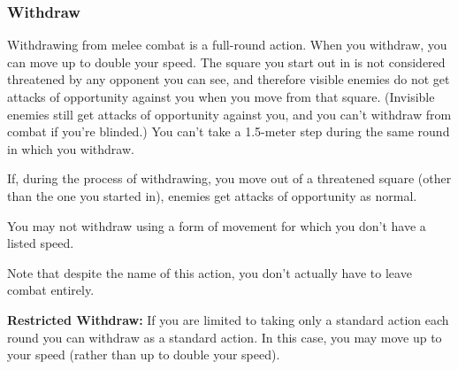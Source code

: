 \subsubsection{Withdraw}
Withdrawing from melee combat is a full-round action. When you withdraw, you can move up to double your speed. The square you start out in is not considered threatened by any opponent you can see, and therefore visible enemies do not get attacks of opportunity against you when you move from that square. (Invisible enemies still get attacks of opportunity against you, and you can't withdraw from combat if you're blinded.) You can't take a 1.5-meter step during the same round in which you withdraw.

If, during the process of withdrawing, you move out of a threatened square (other than the one you started in), enemies get attacks of opportunity as normal.

You may not withdraw using a form of movement for which you don't have a listed speed.

Note that despite the name of this action, you don't actually have to leave combat entirely.

\textbf{Restricted Withdraw:} If you are limited to taking only a standard action each round you can withdraw as a standard action. In this case, you may move up to your speed (rather than up to double your speed).